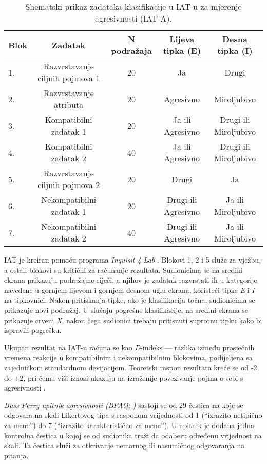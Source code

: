 \documentclass[a4paper, 12pt]{report}
\begin{document}
\begin{table}[h!]
    \centering
    \caption{\label{iata}Shematski prikaz zadataka klasifikacije u IAT-u za
        mjerenje agresivnosti (IAT-A).}
    \hspace*{-0.5cm}\begin{tabular}{l*{4}{c}}
        \toprule
        Blok & Zadatak & N podražaja & Lijeva tipka (E) & Desna tipka (I)\\
        \midrule
        1. & Razvrstavanje ciljnih pojmova 1& 20 & Ja & Drugi\\
        2. & Razvrstavanje atributa & 20 & Agresivno & Miroljubivo\\
        3. & Kompatibilni zadatak 1 & 20 & Ja ili Agresivno & Drugi ili Miroljubivo\\
        4. & Kompatibilni zadatak 2 & 40 & Ja ili Agresivno & Drugi ili Miroljubivo\\
        5. & Razvrstavanje ciljnih pojmova 2 & 20 & Drugi & Ja\\
        6. & Nekompatibilni zadatak 1 & 20 & Drugi ili Agresivno & Ja ili Miroljubivo\\
        7. & Nekompatibilni zadatak 2 & 40 & Drugi ili Agresivno & Ja ili Miroljubivo\\
        \bottomrule
    \end{tabular}
\end{table}

IAT je kreiran pomoću programa \emph{Inquisit 4 Lab} \citep{inq}. 
Blokovi 1, 2 i 5 služe za vježbu, a ostali blokovi su kritični za
računanje rezultata. Sudionicima se na sredini ekrana prikazuju podražajne
riječi, a njihov je zadatak razvrstati ih u kategorije navedene u gornjem
lijevom i gornjem desnom uglu ekrana, koristeći tipke \emph{E} i \emph{I} na
tipkovnici. Nakon pritiskanja tipke, ako je klasifikacija točna,
sudionicima se prikazuje novi podražaj. U slučaju pogrešne klasifikacije, na
sredini ekrana se prikazuje crveni \emph{X}, nakon čega sudionici trebaju
pritisnuti suprotnu tipku kako bi ispravili pogrešku.

Ukupan rezultat na IAT-u računa se kao \emph{D}-indeks ---
razlika između prosječnih vremena reakcije u kompatibilnim i nekompatibilnim
blokovima, podijeljena sa zajedničkom standardnom devijacijom.
Teoretski raspon rezultata kreće se od -2 do +2, pri čemu viši iznosi ukazuju na
izraženije povezivanje pojma o sebi s agresivnosti
\citep{parmavc2015usporedba}.

\emph{Buss-Perry upitnik agresivnosti (BPAQ; \citealp{buss1992aggression})}  sastoji se od
29 čestica na koje se odgovara na skali Likertovog tipa s rasponom vrijednosti
od 1 (\enquote{izrazito netipično za mene}) do 7 (\enquote{izrazito
    karakteristično za mene}). U upitnik je dodana jedna kontrolna čestica u
kojoj se od sudionika traži da odaberu određenu vrijednost na skali. Ta čestica
služi za otkrivanje nemarnog ili nasumičnog odgovaranja na pitanja.
\end{document}
